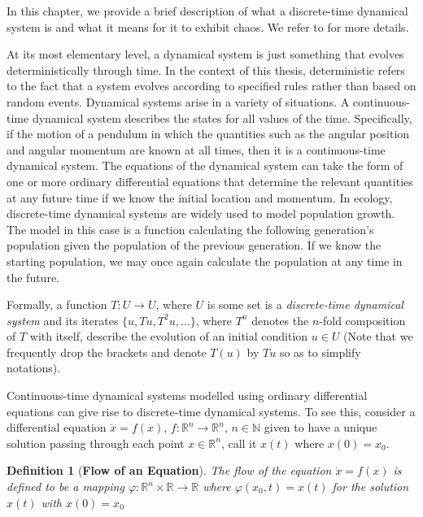 \documentclass[a4paper,12pt,twoside]{report}
\newtheorem{Definition}{Definition}[]
\begin{document}
In this chapter, we provide a brief description of what a discrete-time dynamical system is and what it means for it to exhibit chaos. We refer to \cite{devaney2018introduction, de2013elements} for more details. 

At its most elementary level, a dynamical system is just something that evolves deterministically through time. In the context of this thesis, deterministic refers to the fact that a system evolves according to specified rules rather than based on random events. 
Dynamical systems arise in a variety of situations. A continuous-time dynamical system describes the states for all values of the time. Specifically, if the motion of a pendulum in which the quantities such as the angular position and angular momentum are known at all times, then it is a continuous-time dynamical system. The equations of the dynamical system can take the form of one or more ordinary differential equations that determine the relevant quantities at any future time if we know the initial location and momentum. 
In ecology, discrete-time dynamical systems are widely used to model population growth. The model in this case is a function calculating the following generation's population given the population of the previous generation. If we know the starting population, we may once again calculate the population at any time in the future. 

Formally, a function $T: U \to U$, where $U$ is some set is  a \emph{discrete-time dynamical system} and its iterates $\{u,Tu,T^2u,\ldots\}$, where $T^n$ denotes the $n$-fold composition of $T$ with itself, describe the evolution of an initial condition $u\in U$ (Note that we frequently drop the brackets and denote $T(u)$ by $Tu$ so as to simplify notations).  





Continuous-time dynamical systems modelled using ordinary differential equations can give rise to discrete-time dynamical systems. To see this, consider a differential equation $\dot{x} = f(x)$, $f: \mathbb{R}^n \to \mathbb{R}^n$, $n\in\mathbb{N}$ given to have a unique solution passing through 
each point $x\in\mathbb{R}^{n}$, call it $x(t)$ where $x(0)=x_0$. 

\begin{Definition}
  [\bf Flow of an Equation] \label{Dfn_Flow}\rm
  The flow of the equation  $\dot{x} = f(x)$  is defined to be a mapping $\varphi: \mathbb{R}^n \times \mathbb{R} \to \mathbb{R}$ where $\varphi(x_0,t)= x(t)$ for the solution $x(t)$ with $x(0)=x_0$ 
\end{Definition}
\end{document}
